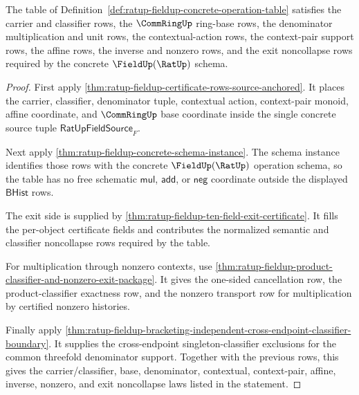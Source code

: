 \begin{theorem}
\label{thm:ratup-fieldup-concrete-operation-table-laws}
The table of
Definition~\ref{def:ratup-fieldup-concrete-operation-table} satisfies the
carrier and classifier rows, the $\CommRingUp$ ring-base rows, the denominator
multiplication and unit rows, the contextual-action rows, the context-pair
support rows, the affine rows, the inverse and nonzero rows, and the exit
noncollapse rows required by the concrete $\FieldUp(\RatUp)$ schema.
\end{theorem}
\begin{proof}
First apply
\autoref{thm:ratup-fieldup-certificate-rows-source-anchored}. It places the
carrier, classifier, denominator tuple, contextual action, context-pair monoid,
affine coordinate, and $\CommRingUp$ base coordinate inside the single concrete
source tuple $\mathsf{RatUpFieldSource}_F$.

Next apply \autoref{thm:ratup-fieldup-concrete-schema-instance}. The schema
instance identifies those rows with the concrete $\FieldUp(\RatUp)$ operation
schema, so the table has no free schematic $\mathsf{mul}$, $\mathsf{add}$, or
$\mathsf{neg}$ coordinate outside the displayed $\mathsf{BHist}$ rows.

The exit side is supplied by
\autoref{thm:ratup-fieldup-ten-field-exit-certificate}. It fills the per-object
certificate fields and contributes the normalized semantic and classifier
noncollapse rows required by the table.

For multiplication through nonzero contexts, use
\autoref{thm:ratup-fieldup-product-classifier-and-nonzero-exit-package}. It gives
the one-sided cancellation row, the product-classifier exactness row, and the
nonzero transport row for multiplication by certified nonzero histories.

Finally apply
\autoref{thm:ratup-fieldup-bracketing-independent-cross-endpoint-classifier-boundary}.
It supplies the cross-endpoint singleton-classifier exclusions for the common
threefold denominator support. Together with the previous rows, this gives the
carrier/classifier, base, denominator, contextual, context-pair, affine,
inverse, nonzero, and exit noncollapse laws listed in the statement.
\end{proof}

